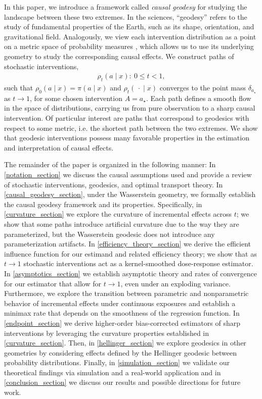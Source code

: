 \documentclass[11pt,twoside]{article}
\theoremstyle{definition}
\theoremstyle{remark}
\begin{document}
In this paper, we introduce a framework called {\em causal geodesy} for studying the landscape between these two extremes. In the sciences, ``geodesy'' refers to the study of fundamental properties of the Earth, such as its shape, orientation, and gravitational field. Analogously, we view each intervention distribution as a point on a metric space of probability measures \citep{ambrosio2008gradient, Villani2009OptimalTransport, amari2016information}, which allows us to use its underlying geometry to study the corresponding causal effects. We construct paths of stochastic interventions,
\begin{align*}
    \rho_t(a \! \mid \! x):\ 0 \leq t < 1,
\end{align*}
such that $\rho_0(a \! \mid \! x) = \pi(a \! \mid \! x)$ and $\rho_t(\, \cdot \! \mid \! x)$ converges to the point mass $\delta_{a_\star}$ as $t \to 1$, for some chosen intervention $A = a_\star$. Each path defines a smooth flow in the space of distributions, carrying us from pure observation to a sharp causal intervention. Of particular interest are paths that correspond to geodesics with respect to some metric, i.e. the shortest path between the two extremes. We show that geodesic interventions possess many favorable properties in the estimation and interpretation of causal effects. 

The remainder of the paper is organized in the following manner: In \cref{notation_section} we discuss the causal assumptions used and provide a review of stochastic interventions, geodesics, and optimal transport theory. In \cref{causal_geodesy_section}, under the Wasserstein geometry, we formally establish the causal geodesy framework and its properties. Specifically, in \cref{curvature_section} we explore the curvature of incremental effects across $t$; we show that some paths introduce artificial curvature due to the way they are parameterized, but the Wasserstein geodesic does not introduce any parameterization artifacts. In \cref{efficiency_theory_section} we derive the efficient influence function for our estimand and related efficiency theory; we show that as $t \to 1$ stochastic interventions act as a kernel-smoothed dose-response estimator. In \cref{asymptotics_section} we establish asymptotic theory and rates of convergence for our estimator that allow for $t \to 1$, even under an exploding variance. Furthermore, we explore the transition between parametric and nonparametric behavior of incremental effects under continuous exposures and establish a minimax rate that depends on the smoothness of the regression function. In \cref{endpoint_section} we derive higher-order bias-corrected estimators of sharp interventions by leveraging the curvature properties established in \cref{curvature_section}. Then, in \cref{hellinger_section} we explore geodesics in other geometries by considering effects defined by the Hellinger geodesic between probability distributions. Finally, in \cref{simulation_section} we validate our theoretical findings via simulation and a real-world application and in \cref{conclusion_section} we discuss our results and possible directions for future work.
\end{document}
